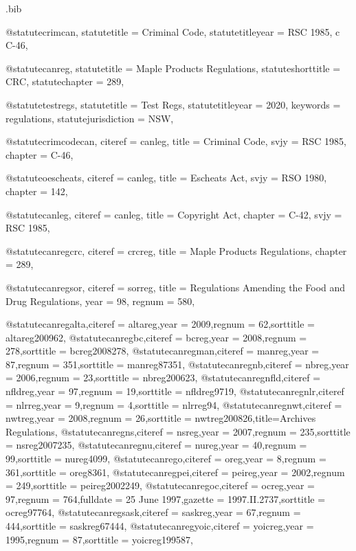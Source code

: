 \begin{filecontents*}[overwrite]{\jobname.bib}

@statute{crimcan,
statutetitle = {Criminal Code},
statutetitleyear = {RSC 1985, c C-46},%
}


@statute{canreg,
statutetitle = {Maple Products Regulations},
statuteshorttitle = {CRC},
statutechapter = {289},
}

@statute{testregs,
statutetitle = {Test Regs},
statutetitleyear = {2020},%
keywords = {regulations},
statutejurisdiction = {NSW},
}




@statute{crimcodecan,
citeref = {canleg},
title = {Criminal Code},
svjy = {RSC 1985},
chapter = {C-46},
}


@statute{oescheats,
citeref = {canleg},
title = {Escheats Act},
svjy = {RSO 1980},
chapter = {142},
}

@statute{canleg,
citeref = {canleg},
title = {Copyright Act},
chapter = {C-42},
svjy = {RSC 1985},
}

@statute{canregcrc,
citeref = {crcreg},
title = {Maple Products Regulations},
chapter = {289},
}


@statute{canregsor,
citeref = {sorreg},
title = {Regulations Amending the Food and Drug Regulations},
year = {98},
regnum = {580},
}

@statute{canregalta,citeref = {altareg},year = {2009},regnum = {62},sorttitle = {altareg200962},}
@statute{canregbc,citeref = {bcreg},year = {2008},regnum = {278},sorttitle = {bcreg2008278},}
@statute{canregman,citeref = {manreg},year = {87},regnum = {351},sorttitle = {manreg87351},}
@statute{canregnb,citeref = {nbreg},year = {2006},regnum = {23},sorttitle = {nbreg200623},}
@statute{canregnfld,citeref = {nfldreg},year = {97},regnum = {19},sorttitle = {nfldreg9719},}
@statute{canregnlr,citeref = {nlrreg},year = {9},regnum = {4},sorttitle = {nlrreg94},}
@statute{canregnwt,citeref = {nwtreg},year = {2008},regnum = {26},sorttitle = {nwtreg200826},title={Archives Regulations},}
@statute{canregns,citeref = {nsreg},year = {2007},regnum = {235},sorttitle = {nsreg2007235},}
@statute{canregnu,citeref = {nureg},year = {40},regnum = {99},sorttitle = {nureg4099},}
@statute{canrego,citeref = {oreg},year = {8},regnum = {361},sorttitle = {oreg8361},}
@statute{canregpei,citeref = {peireg},year = {2002},regnum = {249},sorttitle = {peireg2002249},}
@statute{canregoc,citeref = {ocreg},year = {97},regnum = {764},fulldate = {25 June 1997},gazette = { 1997.II.2737},sorttitle = {ocreg97764},}
@statute{canregsask,citeref = {saskreg},year = {67},regnum = {444},sorttitle = {saskreg67444},}
@statute{canregyoic,citeref = {yoicreg},year = {1995},regnum = {87},sorttitle = {yoicreg199587},}



\end{filecontents*}
